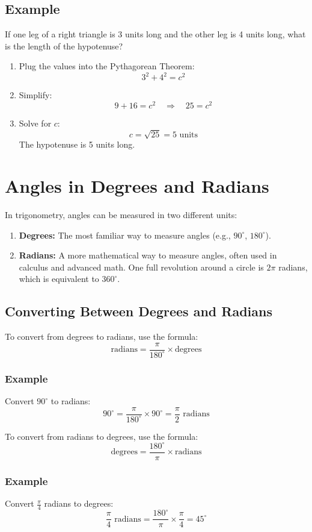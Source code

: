 \subsection{Example}
If one leg of a right triangle is 3 units long and the other leg is 4 units long, what is the length of the hypotenuse?
\begin{enumerate}
    \item Plug the values into the Pythagorean Theorem:
    \[
    3^2 + 4^2 = c^2
    \]
    \item Simplify:
    \[
    9 + 16 = c^2 \quad \Rightarrow \quad 25 = c^2
    \]
    \item Solve for $c$:
    \[
    c = \sqrt{25} = 5 \text{ units}
    \]
    The hypotenuse is 5 units long.
\end{enumerate}

\section{Angles in Degrees and Radians}
In trigonometry, angles can be measured in two different units:
\begin{enumerate}
    \item \textbf{Degrees:} The most familiar way to measure angles (e.g., $90^\circ$, $180^\circ$).
    \item \textbf{Radians:} A more mathematical way to measure angles, often used in calculus and advanced math. One full revolution around a circle is $2\pi$ radians, which is equivalent to $360^\circ$.
\end{enumerate}

\subsection{Converting Between Degrees and Radians}
To convert from degrees to radians, use the formula:
\[
\text{radians} = \frac{\pi}{180^\circ} \times \text{degrees}
\]

\subsubsection{Example}
Convert $90^\circ$ to radians:
\[
90^\circ = \frac{\pi}{180^\circ} \times 90^\circ = \frac{\pi}{2} \text{ radians}
\]

To convert from radians to degrees, use the formula:
\[
\text{degrees} = \frac{180^\circ}{\pi} \times \text{radians}
\]

\subsubsection{Example}
Convert $\frac{\pi}{4}$ radians to degrees:
\[
\frac{\pi}{4} \text{ radians} = \frac{180^\circ}{\pi} \times \frac{\pi}{4} = 45^\circ
\]

